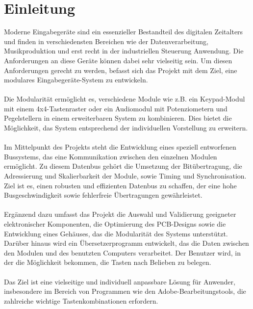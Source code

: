 \chapter{Einleitung}
Moderne Eingabegeräte sind ein essenzieller Bestandteil des digitalen Zeitalters und finden in verschiedensten Bereichen wie der Datenverarbeitung, Musikproduktion und erst recht in der industriellen Steuerung Anwendung. Die Anforderungen an diese Geräte können dabei sehr vielseitig sein. Um diesen Anforderungen gerecht zu werden, befasst sich das Projekt mit dem Ziel, eine modulares Eingabegeräte-System zu entwickeln.
\\
\\
Die Modularität ermöglicht es, verschiedene Module wie z.B. ein Keypad-Modul mit einem 4x4-Tastenraster oder ein Audiomodul mit Potenziometern und Pegelstellern in einem erweiterbaren System zu kombinieren. Dies bietet die Möglichkeit, das System entsprechend der individuellen Vorstellung zu erweitern.
\\
\\
Im Mittelpunkt des Projekts steht die Entwicklung eines speziell entworfenen Bussystems, das eine Kommunikation zwischen den einzelnen Modulen ermöglicht. Zu diesem Datenbus gehört die Umsetzung der Bitübertragung, die Adressierung und Skalierbarkeit der Module, sowie Timing und Synchronisation. Ziel ist es, einen robusten und effizienten Datenbus zu schaffen, der eine hohe Busgeschwindigkeit sowie fehlerfreie Übertragungen gewährleistet.
\\
\\
Ergänzend dazu umfasst das Projekt die Auswahl und Validierung geeigneter elektronischer Komponenten, die Optimierung des PCB-Designs sowie die Entwicklung eines Gehäuses, das die Modularität des Systems unterstützt. Darüber hinaus wird ein Übersetzerprogramm entwickelt, das die Daten zwischen den Modulen und des benutzten Computers verarbeitet. Der Benutzer wird, in der die Möglichkeit bekommen, die Tasten nach Belieben zu belegen.
\\
\\
Das Ziel ist eine vielseitige und individuell anpassbare Lösung für Anwender, insbesondere im Bereich von Programmen wie den Adobe-Bearbeitungstools, die zahlreiche wichtige Tastenkombinationen erfordern.
\newpage